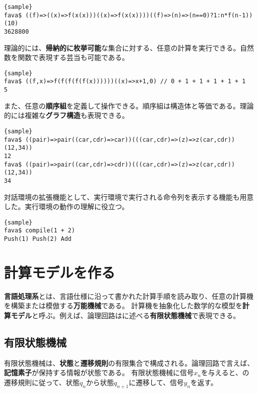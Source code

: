 \documentclass[10pt,a4paper]{book}
\begin{document}
\begin{Verbatim}{sample}
fava$ ((f)=>((x)=>f(x(x)))((x)=>f(x(x))))((f)=>(n)=>(n==0)?1:n*f(n-1))(10)
3628800
\end{Verbatim}

理論的には、\textbf{帰納的に枚挙可能}な集合に対する、任意の計算を実行できる。自然数を関数で表現する芸当も可能である。

\begin{Verbatim}{sample}
fava$ ((f,x)=>f(f(f(f(f(x))))))((x)=>x+1,0) // 0 + 1 + 1 + 1 + 1 + 1
5
\end{Verbatim}

また、任意の\textbf{順序組}を定義して操作できる。順序組は構造体と等価である。理論的には複雑な\textbf{グラフ構造}も表現できる。

\begin{Verbatim}{sample}
fava$ ((pair)=>pair((car,cdr)=>car))(((car,cdr)=>(z)=>z(car,cdr))(12,34))
12
fava$ ((pair)=>pair((car,cdr)=>cdr))(((car,cdr)=>(z)=>z(car,cdr))(12,34))
34
\end{Verbatim}

対話環境の拡張機能として、実行環境で実行される命令列を表示する機能も用意した。実行環境の動作の理解に役立つ。

\begin{Verbatim}{sample}
fava$ compile(1 + 2)
Push(1) Push(2) Add
\end{Verbatim}

\chapter{計算モデルを作る\label{chap:automata}}

\textbf{言語処理系}とは、言語仕様に沿って書かれた計算手順を読み取り、任意の計算機を構築または模倣する\textbf{万能機械}である。
計算機を抽象化した数学的な模型を\textbf{計算モデル}と呼ぶ。例えば、論理回路はに述べる\textbf{有限状態機械}で表現できる。

\section{有限状態機械\label{sect:regex}}

有限状態機械は、\textbf{状態}と\textbf{遷移規則}の有限集合で構成される。論理回路で言えば、\textbf{記憶素子}が保持する情報が状態である。
有限状態機械に信号$x_n$を与えると、の遷移規則に従って、状態$q_n$から状態$q_{n+1}$に遷移して、信号$y_n$を返す。
\end{document}
